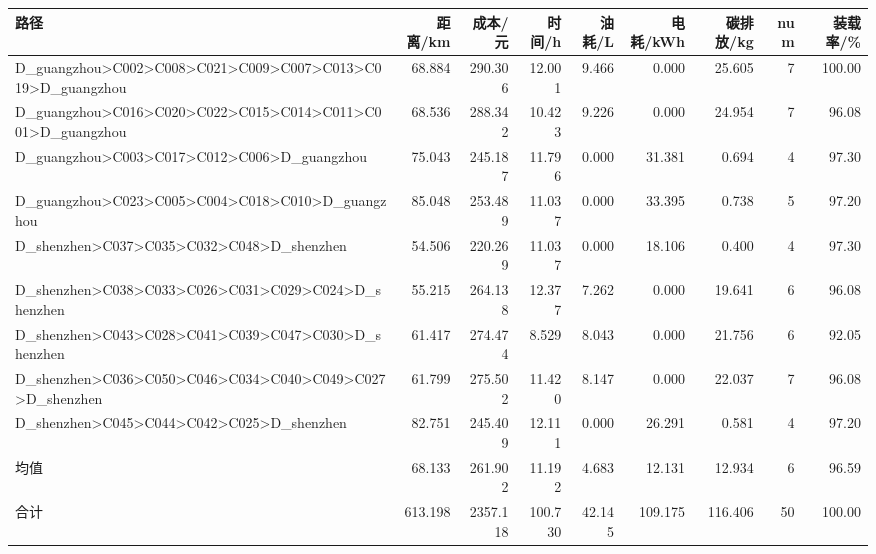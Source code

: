 \begin{tabular}{lrrrrrrrr}
\toprule
路径 & 距离/km & 成本/元 & 时间/h & 油耗/L & 电耗/kWh & 碳排放/kg & num & 装载率/\%  \\
\midrule
D_guangzhou>C002>C008>C021>C009>C007>C013>C019>D_guangzhou & 68.884 & 290.306 & 12.001 & 9.466 & 0.000 & 25.605 & 7 & 100.00 \\
D_guangzhou>C016>C020>C022>C015>C014>C011>C001>D_guangzhou & 68.536 & 288.342 & 10.423 & 9.226 & 0.000 & 24.954 & 7 & 96.08 \\
D_guangzhou>C003>C017>C012>C006>D_guangzhou & 75.043 & 245.187 & 11.796 & 0.000 & 31.381 & 0.694 & 4 & 97.30 \\
D_guangzhou>C023>C005>C004>C018>C010>D_guangzhou & 85.048 & 253.489 & 11.037 & 0.000 & 33.395 & 0.738 & 5 & 97.20 \\
D_shenzhen>C037>C035>C032>C048>D_shenzhen & 54.506 & 220.269 & 11.037 & 0.000 & 18.106 & 0.400 & 4 & 97.30 \\
D_shenzhen>C038>C033>C026>C031>C029>C024>D_shenzhen & 55.215 & 264.138 & 12.377 & 7.262 & 0.000 & 19.641 & 6 & 96.08 \\
D_shenzhen>C043>C028>C041>C039>C047>C030>D_shenzhen & 61.417 & 274.474 & 8.529 & 8.043 & 0.000 & 21.756 & 6 & 92.05 \\
D_shenzhen>C036>C050>C046>C034>C040>C049>C027>D_shenzhen & 61.799 & 275.502 & 11.420 & 8.147 & 0.000 & 22.037 & 7 & 96.08 \\
D_shenzhen>C045>C044>C042>C025>D_shenzhen & 82.751 & 245.409 & 12.111 & 0.000 & 26.291 & 0.581 & 4 & 97.20 \\
均值 & 68.133 & 261.902 & 11.192 & 4.683 & 12.131 & 12.934 & 6 & 96.59 \\
合计 & 613.198 & 2357.118 & 100.730 & 42.145 & 109.175 & 116.406 & 50 & 100.00 \\
\bottomrule
\end{tabular}
